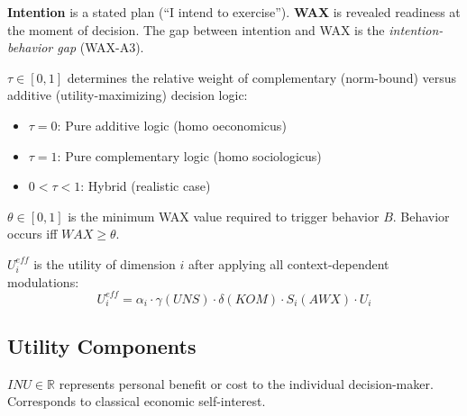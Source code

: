 \begin{definition}
\label{def:wax-not-intention}
\textbf{Intention} is a stated plan (``I intend to exercise'').
\textbf{WAX} is revealed readiness at the moment of decision.
The gap between intention and WAX is the \textit{intention-behavior gap} (WAX-A3).
\end{definition}

\begin{definition}
\label{def:tau}
$\tau \in [0,1]$ determines the relative weight of complementary (norm-bound) versus additive (utility-maximizing) decision logic:
\begin{itemize}
\item $\tau = 0$: Pure additive logic (homo oeconomicus)
\item $\tau = 1$: Pure complementary logic (homo sociologicus)
\item $0 < \tau < 1$: Hybrid (realistic case)
\end{itemize}
\end{definition}

\begin{definition}
\label{def:theta}
$\theta \in [0,1]$ is the minimum WAX value required to trigger behavior $B$. Behavior occurs iff $WAX \geq \theta$.
\end{definition}

\begin{definition}
\label{def:ueff}
$U_i^{eff}$ is the utility of dimension $i$ after applying all context-dependent modulations:
\begin{equation}
U_i^{eff} = \alpha_i \cdot \gamma(UNS) \cdot \delta(KOM) \cdot S_i(AWX) \cdot U_i
\end{equation}
\end{definition}


\subsection{Utility Components}

\begin{definition}
\label{def:inu}
$INU \in \mathbb{R}$ represents personal benefit or cost to the individual decision-maker. Corresponds to classical economic self-interest.
\end{definition}

